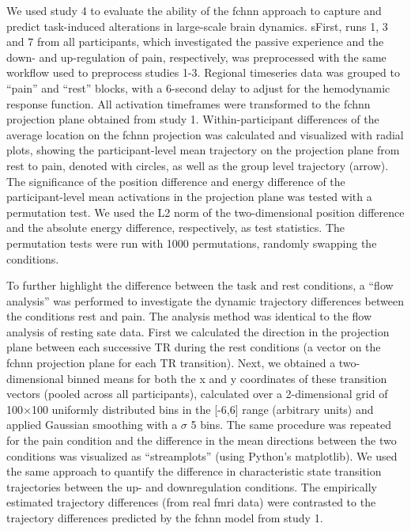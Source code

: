 \documentclass{article}
\begin{document}
We used study 4 to evaluate the ability of the \acrshort{fchnn} approach to capture and predict task-induced alterations in large-scale brain dynamics.
sFirst, runs 1, 3 and 7 from all participants, which investigated the passive experience and the down- and up-regulation of pain, respectively, was preprocessed with the same workflow used to preprocess studies 1-3. Regional timeseries data was grouped to ``pain'' and ``rest'' blocks, with a 6-second delay to adjust for the hemodynamic response function. All activation timeframes were transformed to the \acrshort{fchnn} projection plane obtained from study 1. Within-participant differences of the average location on the \acrshort{fchnn} projection was calculated and visualized with radial plots, showing the participant-level mean trajectory on the projection plane from rest to pain, denoted with circles, as well as the group level trajectory (arrow). The significance of the position difference and energy difference of the participant-level mean activations in the projection plane was tested with a permutation test. We used the L2 norm of the two-dimensional position difference and the absolute energy difference, respectively, as test statistics. The permutation tests were run with 1000 permutations, randomly swapping the conditions.

To further highlight the difference between the task and rest conditions, a ``flow analysis'' was performed to investigate the dynamic trajectory differences between the conditions rest and pain. The analysis method was identical to the flow analysis of resting sate data. First we calculated the direction in the projection plane between each successive TR during the rest conditions (a vector on the \acrshort{fchnn} projection plane for each TR transition). Next, we obtained a two-dimensional binned means for both the x and y coordinates of these transition vectors (pooled across all participants), calculated over a 2-dimensional grid of 100$\times$100 uniformly distributed bins in the [-6,6] range (arbitrary units) and applied Gaussian smoothing with a $\sigma$ 5 bins.
The same procedure was repeated for the pain condition and the difference in the mean directions between the two conditions was visualized as ``streamplots'' (using Python's matplotlib). We used the same approach to quantify the difference in characteristic state transition trajectories between the up- and downregulation conditions. The empirically estimated trajectory differences (from real \acrshort{fmri} data) were contrasted to the trajectory differences predicted by the \acrshort{fchnn} model from study 1.
\end{document}

